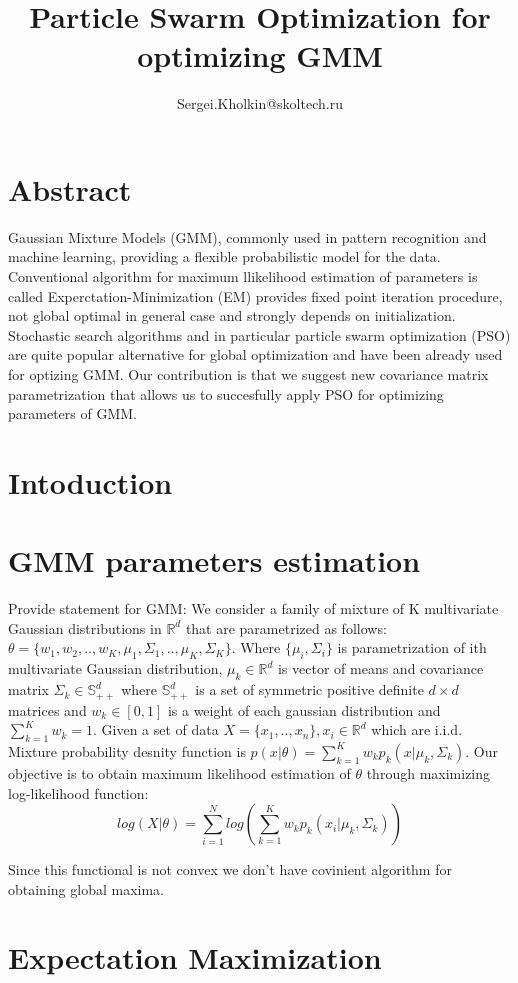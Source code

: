 \documentclass[a4paper]{article}
\title{Particle Swarm Optimization for optimizing GMM}
\author{Sergei.Kholkin@skoltech.ru}
\begin{document}
\section{Abstract}

Gaussian Mixture Models (GMM), commonly used in pattern recognition and machine learning, providing
a flexible probabilistic model for the data. Conventional algorithm for maximum llikelihood estimation of parameters 
is called Experctation-Minimization (EM) provides fixed point iteration procedure, 
not global optimal in general case and strongly depends on initialization. Stochastic search algorithms
 and in particular particle swarm optimization (PSO) are quite
popular alternative for global optimization and have been already used for optizing GMM. 
Our contribution is that we suggest new covariance matrix parametrization that allows us to succesfully apply PSO for optimizing parameters of GMM.

\section{Intoduction}

\section{GMM parameters estimation}

Provide statement for GMM:
We consider a family of mixture of K multivariate Gaussian distributions in $\mathbb{R}^d$ that are
 parametrized as follows: $\theta = \{w_1, w_2, .., w_K, \mu_1, \Sigma_1, .., \mu_K, \Sigma_K\}$. 
 Where $\{\mu_i, \Sigma_i\}$ is parametrization of ith multivariate Gaussian distribution, 
 $\mu_k \in \mathbb{R}^d$ is vector of means and covariance matrix $\Sigma_k \in \mathbb{S}^d_{++}$ where 
 $\mathbb{S}^d_{++}$ is a set of symmetric positive definite $d \times d$ matrices and $w_k \in [0, 1]$ 
 is a weight of each gaussian distribution and $\sum_{k=1}^K w_k=1$.
 Given a set of data $X = \{x_1, .., x_n\}, x_i \in \mathbb{R}^d$ which are i.i.d. Mixture probability desnity function is 
 $p(x | \theta) = \sum_{k=1}^K w_k p_k(x | \mu_k, \Sigma_k)$. Our objective is to obtain maximum likelihood estimation of $\theta$
 through maximizing log-likelihood function:
 $$log(X | \theta) = \sum_{i=1}^N log (\sum_{k=1}^K w_k p_k(x_i | \mu_k, \Sigma_k))$$

 Since this functional is not convex we don't have covinient algorithm for obtaining global maxima.

\section{Expectation Maximization}
\end{document}
